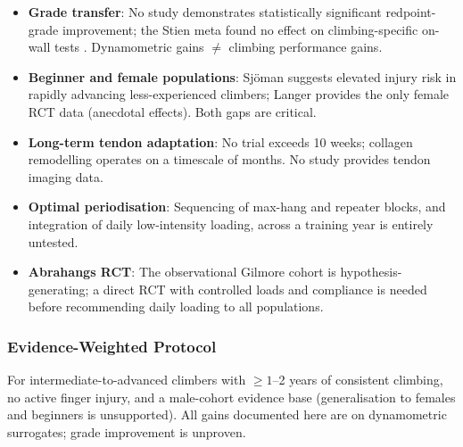 \begin{itemize}[noitemsep, topsep=2pt]
  \item \textbf{Grade transfer}: No study demonstrates statistically significant redpoint-grade improvement; the Stien meta found no effect on climbing-specific on-wall tests \cite{SO23}. Dynamometric gains $\neq$ climbing performance gains.
  \item \textbf{Beginner and female populations}: Sjöman \cite{SGJ23} suggests elevated injury risk in rapidly advancing less-experienced climbers; Langer \cite{LAS24} provides the only female RCT data (anecdotal effects). Both gaps are critical.
  \item \textbf{Long-term tendon adaptation}: No trial exceeds 10 weeks; collagen remodelling operates on a timescale of months. No study provides tendon imaging data.
  \item \textbf{Optimal periodisation}: Sequencing of max-hang and repeater blocks, and integration of daily low-intensity loading, across a training year is entirely untested.
  \item \textbf{Abrahangs RCT}: The observational Gilmore cohort \cite{GKAO24} is hypothesis-generating; a direct RCT with controlled loads and compliance is needed before recommending daily loading to all populations.
\end{itemize}

\subsubsection{Evidence-Weighted Protocol}

For intermediate-to-advanced climbers with $\geq1$--2 years of consistent climbing, no active finger injury, and a male-cohort evidence base (generalisation to females and beginners is unsupported). All gains documented here are on dynamometric surrogates; grade improvement is unproven.

